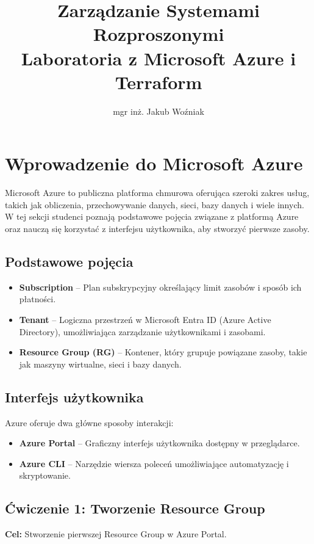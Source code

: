 \documentclass{article}
\title{Zarządzanie Systemami Rozproszonymi\\Laboratoria z Microsoft Azure i Terraform}
\author{mgr inż. Jakub Woźniak}
\date{}
\begin{document}
\maketitle

\section{Wprowadzenie do Microsoft Azure}
Microsoft Azure to publiczna platforma chmurowa oferująca szeroki zakres usług, takich jak obliczenia, przechowywanie danych, sieci, bazy danych i wiele innych. W tej sekcji studenci poznają podstawowe pojęcia związane z platformą Azure oraz nauczą się korzystać z interfejsu użytkownika, aby stworzyć pierwsze zasoby.

\subsection{Podstawowe pojęcia}
\begin{itemize}
    \item \textbf{Subscription} – Plan subskrypcyjny określający limit zasobów i sposób ich płatności.
    \item \textbf{Tenant} – Logiczna przestrzeń w Microsoft Entra ID (Azure Active Directory), umożliwiająca zarządzanie użytkownikami i zasobami.
    \item \textbf{Resource Group (RG)} – Kontener, który grupuje powiązane zasoby, takie jak maszyny wirtualne, sieci i bazy danych.
\end{itemize}

\subsection{Interfejs użytkownika}
Azure oferuje dwa główne sposoby interakcji:
\begin{itemize}
    \item \textbf{Azure Portal} – Graficzny interfejs użytkownika dostępny w przeglądarce.
    \item \textbf{Azure CLI} – Narzędzie wiersza poleceń umożliwiające automatyzację i skryptowanie.
\end{itemize}

\subsection{Ćwiczenie 1: Tworzenie Resource Group}
\textbf{Cel:} Stworzenie pierwszej Resource Group w Azure Portal.
\end{document}
